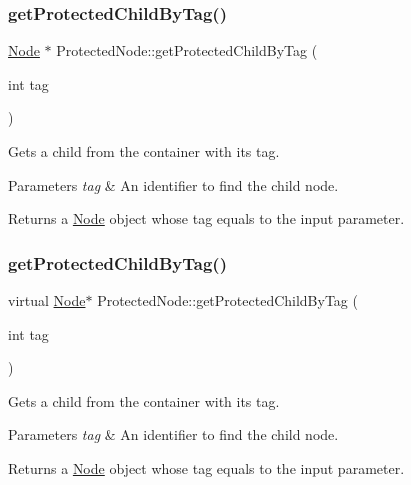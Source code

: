\subsubsection{\texorpdfstring{get\+Protected\+Child\+By\+Tag()}{getProtectedChildByTag()}\hspace{0.1cm}{\footnotesize\ttfamily [1/2]}}
{\footnotesize\ttfamily \hyperlink{classNode}{Node} $\ast$ Protected\+Node\+::get\+Protected\+Child\+By\+Tag (\begin{DoxyParamCaption}\item[{int}]{tag }\end{DoxyParamCaption})\hspace{0.3cm}{\ttfamily [virtual]}}

Gets a child from the container with its tag.


\begin{DoxyParams}{Parameters}
{\em tag} & An identifier to find the child node.\\
\hline
\end{DoxyParams}
\begin{DoxyReturn}{Returns}
a \hyperlink{classNode}{Node} object whose tag equals to the input parameter. 
\end{DoxyReturn}
\mbox{\label{classProtectedNode_a8ce823510d08580d4a8179ccf9aa1446}} 
\subsubsection{\texorpdfstring{get\+Protected\+Child\+By\+Tag()}{getProtectedChildByTag()}\hspace{0.1cm}{\footnotesize\ttfamily [2/2]}}
{\footnotesize\ttfamily virtual \hyperlink{classNode}{Node}$\ast$ Protected\+Node\+::get\+Protected\+Child\+By\+Tag (\begin{DoxyParamCaption}\item[{int}]{tag }\end{DoxyParamCaption})\hspace{0.3cm}{\ttfamily [virtual]}}

Gets a child from the container with its tag.


\begin{DoxyParams}{Parameters}
{\em tag} & An identifier to find the child node.\\
\hline
\end{DoxyParams}
\begin{DoxyReturn}{Returns}
a \hyperlink{classNode}{Node} object whose tag equals to the input parameter. 
\end{DoxyReturn}
\mbox{\label{classProtectedNode_ade991090bee4173b4e1f47382adc99b9}} 
